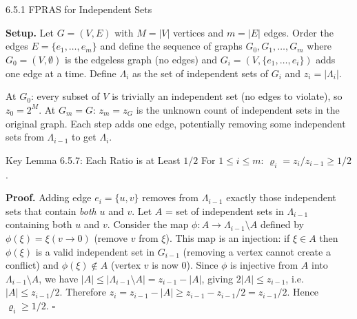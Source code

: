 \documentclass[aspectratio=169,10pt]{beamer}
\begin{document}
\begin{frame}[allowframebreaks]{6.5.1 FPRAS for Independent Sets}

\textbf{Setup.}
Let $G = (V, E)$ with $M = |V|$ vertices and $m = |E|$ edges.
Order the edges $E = \{e_1, \ldots, e_m\}$ and define the sequence of graphs $G_0, G_1, \ldots, G_m$ where $G_0 = (V, \emptyset)$ is the edgeless graph (no edges) and $G_i = (V, \{e_1, \ldots, e_i\})$ adds one edge at a time.
Define $\Lambda_i$ as the set of independent sets of $G_i$ and $z_i = |\Lambda_i|$.

At $G_0$: every subset of $V$ is trivially an independent set (no edges to violate), so $z_0 = 2^M$.
At $G_m = G$: $z_m = z_G$ is the unknown count of independent sets in the original graph.
Each step adds one edge, potentially removing some independent sets from $\Lambda_{i-1}$ to get $\Lambda_i$.

\begin{block}{Key Lemma 6.5.7: Each Ratio is at Least $1/2$}
For $1 \le i \le m$: $\varrho_i = z_i / z_{i-1} \ge 1/2$.

\textbf{Proof.}
Adding edge $e_i = \{u,v\}$ removes from $\Lambda_{i-1}$ exactly those independent sets that contain \emph{both} $u$ and $v$.
Let $A$ = set of independent sets in $\Lambda_{i-1}$ containing both $u$ and $v$.
Consider the map $\phi: A \to \Lambda_{i-1} \setminus A$ defined by $\phi(\xi) = \xi(v \to 0)$ (remove $v$ from $\xi$).
This map is an injection: if $\xi \in A$ then $\phi(\xi)$ is a valid independent set in $G_{i-1}$ (removing a vertex cannot create a conflict) and $\phi(\xi) \notin A$ (vertex $v$ is now 0).
Since $\phi$ is injective from $A$ into $\Lambda_{i-1} \setminus A$, we have $|A| \le |\Lambda_{i-1} \setminus A| = z_{i-1} - |A|$, giving $2|A| \le z_{i-1}$, i.e.\ $|A| \le z_{i-1}/2$.
Therefore $z_i = z_{i-1} - |A| \ge z_{i-1} - z_{i-1}/2 = z_{i-1}/2$.
Hence $\varrho_i \ge 1/2$. $\square$
\end{block}

\framebreak


\end{frame}
\end{document}

